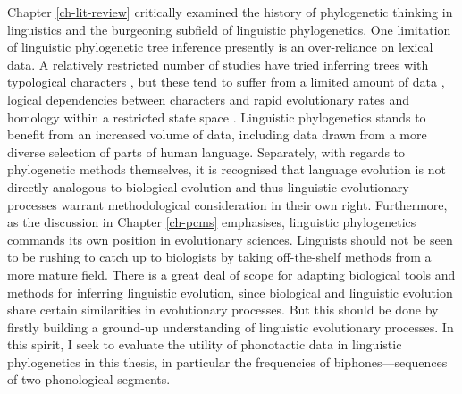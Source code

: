 Chapter \ref{ch-lit-review} critically examined the history of phylogenetic thinking in linguistics and the burgeoning subfield of linguistic phylogenetics. One limitation of linguistic phylogenetic tree inference presently is an over-reliance on lexical data. A relatively restricted number of studies have tried inferring trees with typological characters \autocites[e.g.][]{dunn_structural_2005}{dunn_structural_2008}{sicoli_linguistic_2014}, but these tend to suffer from a limited amount of data \autocite{yanovich_phylogenetic_2020}, logical dependencies between characters \autocite{yanovich_phylogenetic_2020} and rapid evolutionary rates and homology within a restricted state space \autocite{greenhill_evolutionary_2017}. Linguistic phylogenetics stands to benefit from an increased volume of data, including data drawn from a more diverse selection of parts of human language. Separately, with regards to phylogenetic methods themselves, it is recognised that language evolution is not directly analogous to biological evolution and thus linguistic evolutionary processes warrant methodological consideration in their own right. Furthermore, as the discussion in Chapter \ref{ch-pcms} emphasises, linguistic phylogenetics commands its own position in evolutionary sciences. Linguists should not be seen to be rushing to catch up to biologists by taking off-the-shelf methods from a more mature field. There is a great deal of scope for adapting biological tools and methods for inferring linguistic evolution, since biological and linguistic evolution share certain similarities in evolutionary processes. But this should be done by firstly building a ground-up understanding of linguistic evolutionary processes. In this spirit, I seek to evaluate the utility of phonotactic data in linguistic phylogenetics in this thesis, in particular the frequencies of biphones---sequences of two phonological segments.

